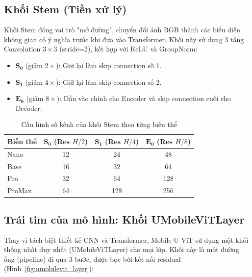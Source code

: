 \documentclass[conference]{IEEEtran}
\begin{document}
\subsection{Khối Stem (Tiền xử lý)}

Khối Stem đóng vai trò "mở đường", chuyển đổi ảnh RGB thành các biểu diễn không gian có ý nghĩa trước khi đưa vào Transformer. Khối này sử dụng 3 tầng Convolution $3\times3$ (stride=2), kết hợp với ReLU và GroupNorm:

\begin{itemize}
    \item $\mathbf{S_0}$ (giảm $2\times$): Giữ lại làm skip connection số 1.
    \item $\mathbf{S_1}$ (giảm $4\times$): Giữ lại làm skip connection số 2.
    \item $\mathbf{E_0}$ (giảm $8\times$): Đầu vào chính cho Encoder và skip connection cuối cho Decoder.
\end{itemize}

\begin{table}[t]
\centering
\caption{Cấu hình số kênh của khối Stem theo từng biến thể}
\label{tab:stem_channels}
\begin{tabular}{l|c|c|c}
\toprule
\textbf{Biến thể} & $\mathbf{S_0}$ (Res $H/2$) & $\mathbf{S_1}$ (Res $H/4$) & $\mathbf{E_0}$ (Res $H/8$) \\
\midrule
Nano   & 12  & 24  & 48 \\
Base   & 16  & 32  & 64 \\
Pro    & 32  & 64  & 128 \\
ProMax & 64  & 128 & 256 \\
\bottomrule
\end{tabular}
\end{table}

\subsection{Trái tim của mô hình: Khối UMobileViTLayer}

Thay vì tách biệt thiết kế CNN và Transformer, Mobile-U-ViT sử dụng một khối thống nhất duy nhất (UMobileViTLayer) cho mọi lớp. Khối này là một đường ống (pipeline) đi qua 3 bước, được bọc bởi kết nối residual (Hình~\ref{fig:umobilevit_layer}):
\end{document}
